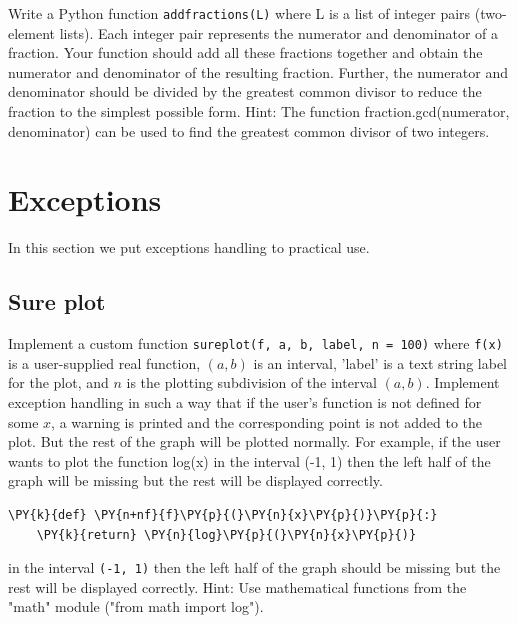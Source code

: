 Write a Python function {\tt addfractions(L)} where L is a list of integer pairs (two-element lists). Each integer pair represents the numerator and denominator of a fraction. Your function should add all these fractions together and obtain the numerator and denominator of the resulting fraction. Further, the numerator and denominator should be divided by the greatest common divisor to reduce the fraction to the simplest possible form. Hint: The function fraction.gcd(numerator, denominator) can be used to find the greatest common divisor of two integers.


\section{Exceptions}

In this section we put exceptions handling to practical use.


\subsection{Sure plot}

Implement a custom function {\tt sureplot(f, a, b, label, n = 100)} where {\tt f(x)} is a user-supplied real function, 
$(a, b)$ is an interval, 'label' is a text string label for the plot, and $n$ is the plotting subdivision of the interval $(a, b)$. 
Implement exception handling in such a way that if the user's function is not defined for some $x$, a warning is printed and the 
corresponding point is not added to the plot. But the rest of the graph will be plotted normally. For example, if the user wants 
to plot the function log(x) in the interval (-1, 1) then the left half of the graph will be missing but the rest will be displayed correctly.
\begin{Verbatim}[commandchars=\\\{\}]
\PY{k}{def} \PY{n+nf}{f}\PY{p}{(}\PY{n}{x}\PY{p}{)}\PY{p}{:}
    \PY{k}{return} \PY{n}{log}\PY{p}{(}\PY{n}{x}\PY{p}{)}
\end{Verbatim}
in the interval {\tt (-1, 1)} then the left half of the graph should be missing but the rest 
will be displayed correctly. Hint: Use mathematical functions from the "math" module ("from math 
import log").

